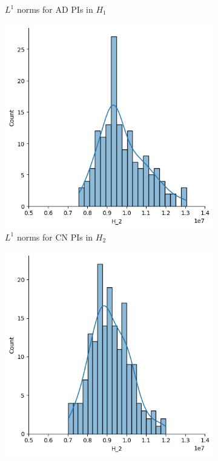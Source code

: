 \documentclass{article}
\begin{document}
\begin{figure}[htb]
\begin{subfigure}{0.32\textwidth}
    \caption{$L^1$ norms for AD PIs in $H_1$}
  \end{subfigure}
  \begin{subfigure}{0.32\textwidth}
    \includegraphics[width=\textwidth]{figures/median_pis/median_pi_CN_H_2_displot.png}
    \caption{$L^1$ norms for CN PIs in $H_2$}
  \end{subfigure}
  \begin{subfigure}{0.32\textwidth}
    \includegraphics[width=\textwidth]{figures/median_pis/median_pi_MCI_H_2_displot.png}

\end{subfigure}
\end{figure}
\end{document}
